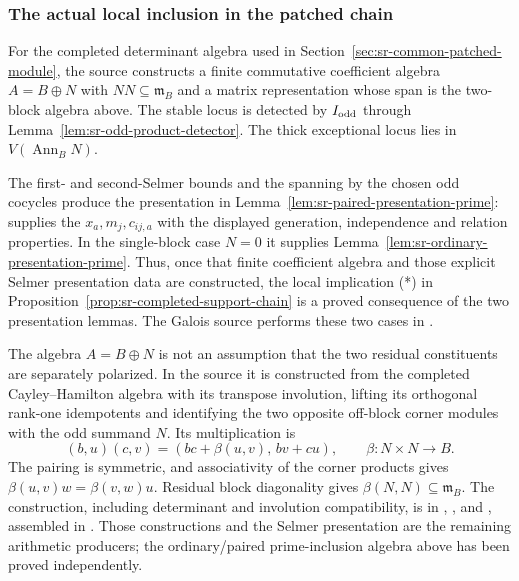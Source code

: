 \subsubsection{The actual local inclusion in the patched chain}
For the completed determinant algebra used in
Section~\ref{sec:sr-common-patched-module}, the source constructs
a finite commutative coefficient algebra $A=B\oplus N$ with
$NN\subseteq\mathfrak m_B$ and a matrix representation whose span is
the two-block algebra above.
The stable locus is detected by $I_{\rm odd}$ through
Lemma~\ref{lem:sr-odd-product-detector}.
The thick exceptional locus lies in
$V(\operatorname{Ann}_BN)$.

The first- and second-Selmer bounds and the spanning by the chosen
odd cocycles produce the presentation in
Lemma~\ref{lem:sr-paired-presentation-prime}:
 supplies the $x_a,m_j,c_{ij,a}$ with the
displayed generation, independence and relation properties.
In the single-block case $N=0$ it supplies
Lemma~\ref{lem:sr-ordinary-presentation-prime}.
Thus, once that finite coefficient algebra and those explicit Selmer
presentation data are constructed, the local implication (*) in
Proposition~\ref{prop:sr-completed-support-chain} is a proved
consequence of the two presentation lemmas.
The Galois source performs these two cases in
.

The algebra $A=B\oplus N$ is not an assumption that the two residual
constituents are separately polarized.
In the source it is constructed from the completed
Cayley--Hamilton algebra with its transpose involution, lifting its
orthogonal rank-one idempotents and identifying the two opposite
off-block corner modules with the odd summand $N$.
Its multiplication is
\[
       (b,u)(c,v)=(bc+\beta(u,v),\,bv+cu),
                    \qquad\beta:N\times N\longrightarrow B.
\]
The pairing is symmetric, and associativity of the corner products
gives $\beta(u,v)w=\beta(v,w)u$.
Residual block diagonality gives $\beta(N,N)\subseteq\mathfrak m_B$.
The construction, including determinant and involution compatibility,
is in ,
,  and ,
assembled in .
Those constructions and the Selmer presentation are the remaining
arithmetic producers; the ordinary/paired prime-inclusion algebra
above has been proved independently.

